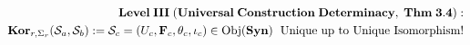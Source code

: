 \documentclass[preview]{standalone}
\begin{document}
\begin{align*}
\special{dvisvgm:raw <g id='unique000'>}\mathbf{Level\;III\;(Universal\;Construction\;Determinacy,\;Thm\;3.4):}\\\mathbf{Kor}_{r,\Sigma_r}(\mathcal{S}_a,\mathcal{S}_b) := \mathcal{S}_c = (U_c,\mathbf{F}_c,\theta_c,\iota_c)\in\operatorname{Obj}(\mathbf{Syn})\;\text{ Unique up to Unique Isomorphism!}\special{dvisvgm:raw </g>}
\end{align*}
\end{document}
